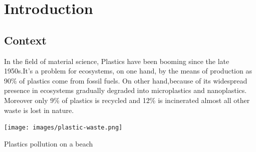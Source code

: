 \chapter{Introduction}

\section{Context}
In the field of material science, Plastics have been booming since the late 1950s\cite{geyer2017production}.It's a problem for ecosystems, on one hand, by the means of production as 90\% of plastics come from fossil fuels. On other hand,because of its widespread presence in ecosystems gradually degraded into microplastics and nanoplastics. Moreover only 9\% of plastics is recycled and 12\% is incinerated almost all other waste is lost in nature\cite{natureeditorial}.




\begin{marginfigure}[-5cm] %
    \centering
    \texttt{[image: images/plastic-waste.png]}
    \caption{Plastics pollution on a beach}
    \label{fig:plastics}
\end{marginfigure}








